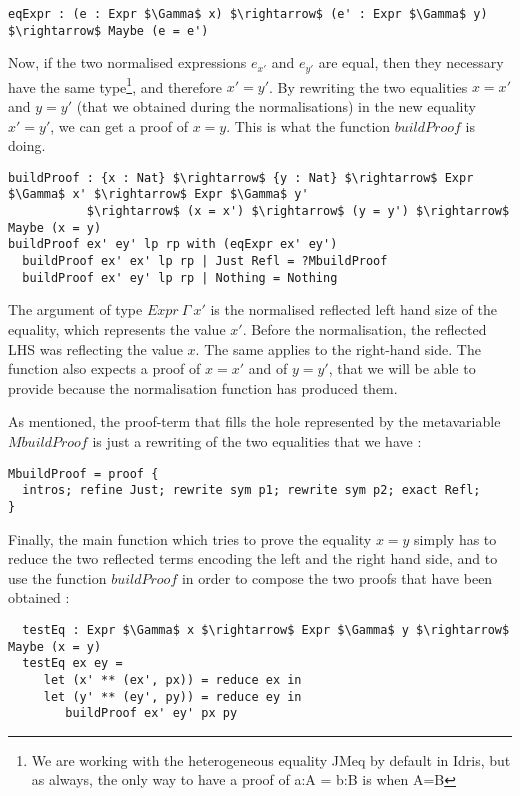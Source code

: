 \begin{lstlisting}
eqExpr : (e : Expr $\Gamma$ x) $\rightarrow$ (e' : Expr $\Gamma$ y) $\rightarrow$ Maybe (e = e')
\end{lstlisting}


Now, if the two normalised expressions $e_{x'}$ and $e_{y'}$ are equal, then they necessary have the same type\footnote{We are working with the heterogeneous equality JMeq by default in Idris, but as always, the only way to have a proof of a:A = b:B is when A=B}, and therefore $x'=y'$.
By rewriting the two equalities $x=x'$ and $y=y'$ (that we obtained during the normalisations) in the new equality $x'=y'$, we can get a proof of $x=y$. This is what the function $buildProof$ is doing.

\begin{lstlisting}
buildProof : {x : Nat} $\rightarrow$ {y : Nat} $\rightarrow$ Expr $\Gamma$ x' $\rightarrow$ Expr $\Gamma$ y' 
           $\rightarrow$ (x = x') $\rightarrow$ (y = y') $\rightarrow$ Maybe (x = y)
buildProof ex' ey' lp rp with (eqExpr ex' ey')
  buildProof ex' ex' lp rp | Just Refl = ?MbuildProof
  buildProof ex' ey' lp rp | Nothing = Nothing
\end{lstlisting}


The argument of type $Expr\ \Gamma\ x'$ is the normalised reflected left hand size of the equality, which represents the value $x'$. Before the normalisation, the reflected LHS was reflecting the value $x$. The same applies to the right-hand side. The function also expects a proof of $x=x'$ and of $y=y'$, that we will be able to provide because the normalisation function has produced them.

As mentioned, the proof-term that fills the hole represented by the metavariable $MbuildProof$ is just a rewriting of the two equalities that we have :

\begin{lstlisting}
MbuildProof = proof {
  intros; refine Just; rewrite sym p1; rewrite sym p2; exact Refl;
}  
\end{lstlisting}


Finally, the main function which tries to prove the equality $x=y$ simply has to reduce the two reflected terms encoding the left and the right hand side, and to use the function $buildProof$ in order to compose the two proofs that have been obtained :


\begin{lstlisting}
  testEq : Expr $\Gamma$ x $\rightarrow$ Expr $\Gamma$ y $\rightarrow$ Maybe (x = y)
  testEq ex ey = 
     let (x' ** (ex', px)) = reduce ex in 
     let (y' ** (ey', py)) = reduce ey in
        buildProof ex' ey' px py 
\end{lstlisting}


